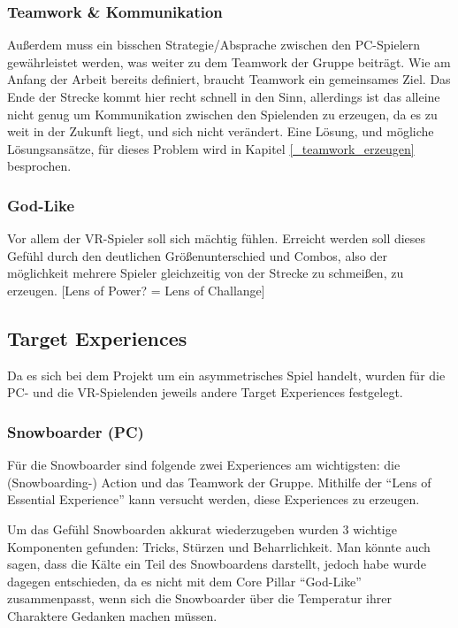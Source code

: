 \subsubsection{Teamwork \& Kommunikation}
Außerdem muss ein bisschen Strategie/Absprache zwischen den PC-Spielern gewährleistet werden, was weiter zu dem Teamwork der Gruppe beiträgt. Wie am Anfang der Arbeit bereits definiert, braucht Teamwork ein gemeinsames Ziel. Das Ende der Strecke kommt hier recht schnell in den Sinn, allerdings ist das alleine nicht genug um Kommunikation zwischen den Spielenden zu erzeugen, da es zu weit in der Zukunft liegt, und sich nicht verändert. Eine Lösung, und mögliche Lösungsansätze, für dieses Problem wird in Kapitel \ref{_teamwork_erzeugen} besprochen.

\subsubsection{God-Like}
Vor allem der VR-Spieler soll sich mächtig fühlen. Erreicht werden soll dieses Gefühl durch den deutlichen Größenunterschied und Combos, also der möglichkeit mehrere Spieler gleichzeitig von der Strecke zu schmeißen, zu erzeugen.
[Lens of Power? = Lens of Challange]

\subsection{Target Experiences}

Da es sich bei dem Projekt um ein asymmetrisches Spiel handelt, wurden für die PC- und die VR-Spielenden jeweils andere Target Experiences festgelegt.

\subsubsection{Snowboarder (PC)}
Für die Snowboarder sind folgende zwei Experiences am wichtigsten: die (Snowboarding-) Action und das Teamwork der Gruppe. Mithilfe der "`Lens of Essential Experience"'\cite[S. 55]{_art_of_gamedesign} kann versucht werden, diese Experiences zu erzeugen.

Um das Gefühl Snowboarden akkurat wiederzugeben wurden 3 wichtige Komponenten gefunden: Tricks, Stürzen und Beharrlichkeit. Man könnte auch sagen, dass die Kälte ein Teil des Snowboardens darstellt, jedoch habe wurde dagegen entschieden, da es nicht mit dem Core Pillar "`God-Like"' zusammenpasst, wenn sich die Snowboarder über die Temperatur ihrer Charaktere Gedanken machen müssen.

